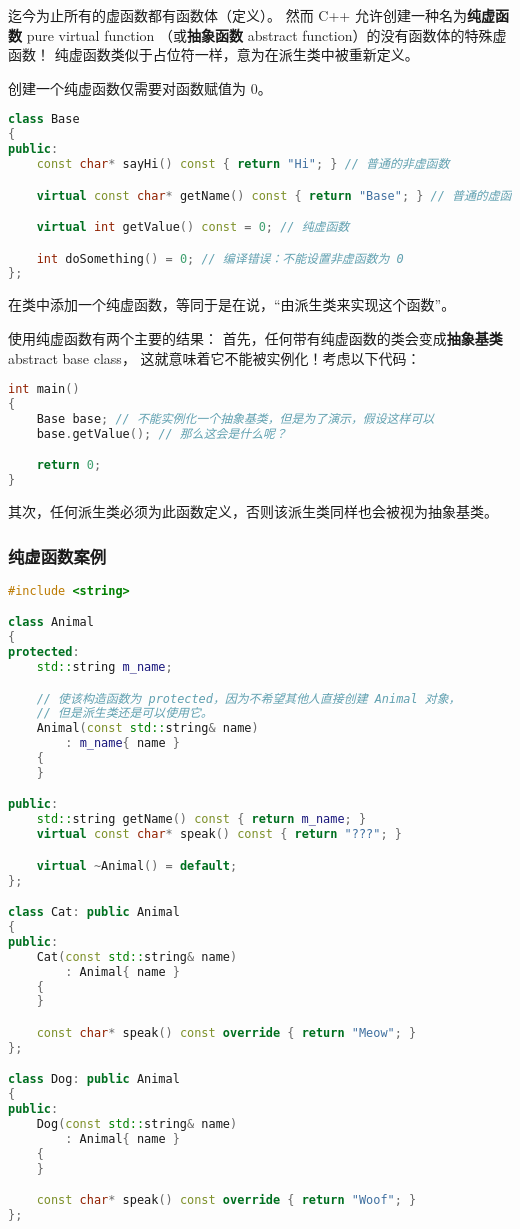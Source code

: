 \documentclass[../../LearnCpp.tex]{subfiles}
\begin{document}

迄今为止所有的虚函数都有函数体（定义）。
然而 C++ 允许创建一种名为\textbf{纯虚函数} pure virtual function
（或\textbf{抽象函数} abstract function）的没有函数体的特殊虚函数！
纯虚函数类似于占位符一样，意为在派生类中被重新定义。

创建一个纯虚函数仅需要对函数赋值为 0。

\begin{lstlisting}[language=C++]
class Base
{
public:
    const char* sayHi() const { return "Hi"; } // 普通的非虚函数

    virtual const char* getName() const { return "Base"; } // 普通的虚函数

    virtual int getValue() const = 0; // 纯虚函数

    int doSomething() = 0; // 编译错误：不能设置非虚函数为 0
};
\end{lstlisting}

在类中添加一个纯虚函数，等同于是在说，“由派生类来实现这个函数”。

使用纯虚函数有两个主要的结果：
首先，任何带有纯虚函数的类会变成\textbf{抽象基类} abstract base class，
这就意味着它不能被实例化！考虑以下代码：

\begin{lstlisting}[language=C++]
int main()
{
    Base base; // 不能实例化一个抽象基类，但是为了演示，假设这样可以
    base.getValue(); // 那么这会是什么呢？

    return 0;
}
\end{lstlisting}

其次，任何派生类必须为此函数定义，否则该派生类同样也会被视为抽象基类。

\subsubsection*{纯虚函数案例}

\begin{lstlisting}[language=C++]
#include <string>

class Animal
{
protected:
    std::string m_name;

    // 使该构造函数为 protected，因为不希望其他人直接创建 Animal 对象，
    // 但是派生类还是可以使用它。
    Animal(const std::string& name)
        : m_name{ name }
    {
    }

public:
    std::string getName() const { return m_name; }
    virtual const char* speak() const { return "???"; }

    virtual ~Animal() = default;
};

class Cat: public Animal
{
public:
    Cat(const std::string& name)
        : Animal{ name }
    {
    }

    const char* speak() const override { return "Meow"; }
};

class Dog: public Animal
{
public:
    Dog(const std::string& name)
        : Animal{ name }
    {
    }

    const char* speak() const override { return "Woof"; }
};
\end{lstlisting}
\end{document}
